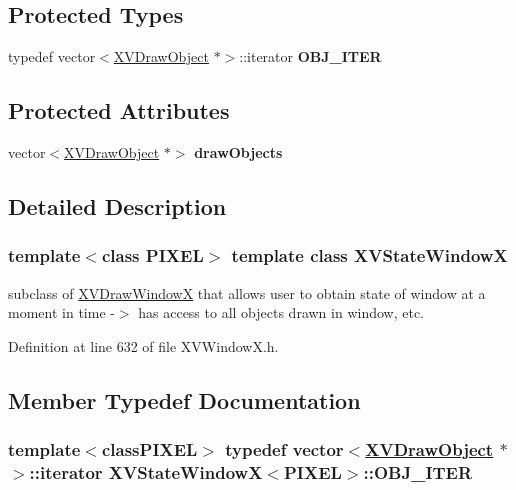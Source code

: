 \subsection*{Protected Types}
\begin{CompactItemize}
\item 
typedef vector$<$\hyperlink{class_XVDrawObject}{XVDraw\-Object} $\ast$$>$::iterator {\bf OBJ\_\-ITER}
\end{CompactItemize}
\subsection*{Protected Attributes}
\begin{CompactItemize}
\item 
vector$<$\hyperlink{class_XVDrawObject}{XVDraw\-Object} $\ast$$>$ {\bf draw\-Objects}
\end{CompactItemize}


\subsection{Detailed Description}
\subsubsection*{template$<$class PIXEL$>$  template class XVState\-Window\-X}

subclass of \hyperlink{class_XVDrawWindowX}{XVDraw\-Window\-X} that allows user to obtain state of window at a moment in time -$>$ has access to all objects drawn in window, etc.





Definition at line 632 of file XVWindow\-X.h.

\subsection{Member Typedef Documentation}
\label{XVStateWindowX_t0}
\hypertarget{class_XVStateWindowX_t0}{
\subsubsection[OBJ_ITER]{\setlength{\rightskip}{0pt plus 5cm}template$<$classPIXEL$>$ typedef vector$<$\hyperlink{class_XVDrawObject}{XVDraw\-Object} $\ast$$>$::iterator XVState\-Window\-X$<$PIXEL$>$::OBJ\_\-ITER}}




